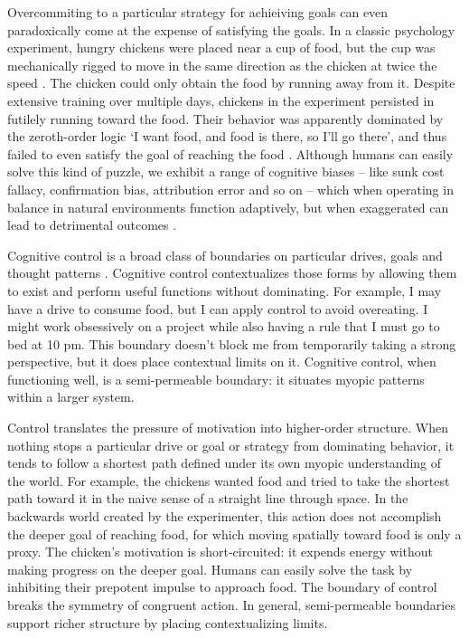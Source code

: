 \documentclass[12pt]{article}
\begin{document}
Overcommiting to a particular strategy for achieiving goals can even paradoxically come at the expense of satisfying the goals. In a classic psychology experiment, hungry chickens were placed near a cup of food, but the cup was mechanically rigged to move in the same direction as the chicken at twice the speed \citep{hershberger1986approach}. The chicken could only obtain the food by running away from it. Despite extensive training over multiple days, chickens in the experiment persisted in futilely running toward the food. Their behavior was apparently dominated by the zeroth-order logic `I want food, and food is there, so I'll go there', and thus failed to even satisfy the goal of reaching the food \citep{dayan2006misbehavior, van2012information, o2017learning}. Although humans can easily solve this kind of puzzle, we exhibit a range of cognitive biases -- like sunk cost fallacy, confirmation bias, attribution error and so on -- which when operating in balance in natural environments function adaptively, but when exaggerated can lead to detrimental outcomes \citep{kahneman2011thinking, gilovich2002heuristics}.

Cognitive control is a broad class of boundaries on particular drives, goals and thought patterns \citep{botvinick2001conflict, braver2012variable, miyake2000unity, miller2001integrative}. Cognitive control contextualizes those forms by allowing them to exist and perform useful functions without dominating. For example, I may have a drive to consume food, but I can apply control to avoid overeating. I might work obsessively on a project while also having a rule that I must go to bed at 10 pm. This boundary doesn't block me from temporarily taking a strong perspective, but it does place contextual limits on it. Cognitive control, when functioning well, is a semi-permeable boundary: it situates myopic patterns within a larger system. 

Control translates the pressure of motivation into higher-order structure. When nothing stops a particular drive or goal or strategy from dominating behavior, it tends to follow a shortest path defined under its own myopic understanding of the world. For example, the chickens wanted food and tried to take the shortest path toward it in the naive sense of a straight line through space. In the backwards world created by the experimenter, this action does not accomplish the deeper goal of reaching food, for which moving spatially toward food is only a proxy. The chicken's motivation is short-circuited: it expends energy without making progress on the deeper goal. Humans can easily solve the task by inhibiting their prepotent impulse to approach food. The boundary of control breaks the symmetry of congruent action. In general, semi-permeable boundaries support richer structure by placing contextualizing limits.
\end{document}
